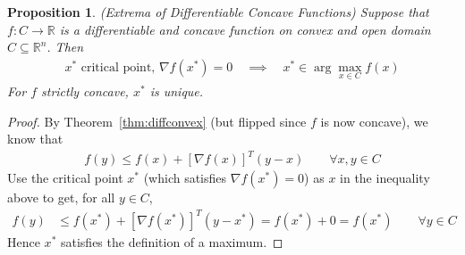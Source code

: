 \documentclass[12pt]{article}
\numberwithin{equation}{section} %
\theoremstyle{plain}
\newtheorem{prop}[thm]{Proposition}
\theoremstyle{definition}
\theoremstyle{remark}
\newcommand{\R}{\mathbb{R}}
\newcommand{\Rn}{\mathbb{R}^n}
\begin{document}
\begin{prop}{\emph{(Extrema of Differentiable Concave Functions)}}
Suppose that $f:C\rightarrow\R$ is a differentiable and concave function
on convex and open domain $C\subseteq\Rn$. Then
\begin{align*}
  \text{$x^*$ critical point, $\nabla f(x^*)=0$}
  \quad\implies\quad
  x^* \in \arg\max_{x\in C} f(x)
\end{align*}
For $f$ \emph{strictly} concave, $x^*$ is \emph{unique}.
\end{prop}
\begin{proof}
By Theorem~\ref{thm:diffconvex} (but flipped since $f$ is now concave),
we know that
\begin{align*}
  f(y) \leq f(x) + [\nabla f(x)]^T (y-x)
  \qquad \forall x,y\in C
\end{align*}
Use the critical point $x^*$ (which satisfies $\nabla f(x^*)=0$) as $x$
in the inequality above to get, for all $y\in C$,
\begin{align*}
  f(y) &\leq f(x^*) + [\nabla f(x^*)]^T (y-x^*)
  = f(x^*) + 0
  = f(x^*)
  \qquad\forall y\in C
\end{align*}
Hence $x^*$ satisfies the definition of a maximum.
\end{proof}
\end{document}
